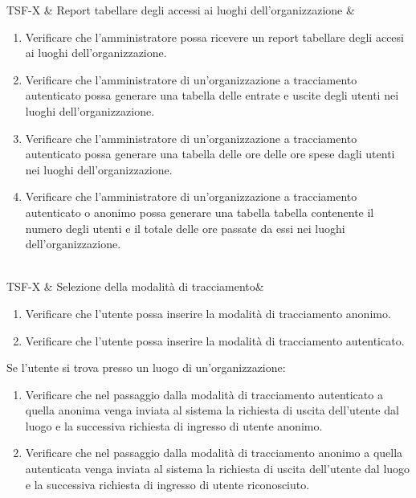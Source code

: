 TSF-X & Report tabellare degli accessi ai luoghi dell'organizzazione  & \begin{enumerate}
\item Verificare che l'amministratore possa ricevere un report tabellare degli accesi ai luoghi dell'organizzazione.
\item Verificare che l'amministratore di un'organizzazione a tracciamento autenticato possa generare una tabella delle entrate e uscite degli utenti nei luoghi dell'organizzazione.
\item Verificare che l'amministratore di un'organizzazione a tracciamento autenticato possa generare una tabella delle ore delle ore spese dagli utenti nei luoghi dell'organizzazione.
\item Verificare che l'amministratore di un'organizzazione a tracciamento autenticato o anonimo possa generare una tabella tabella contenente il numero degli utenti e il totale delle ore passate da essi nei luoghi dell’organizzazione. 
\end{enumerate} \\


TSF-X & Selezione della modalità di tracciamento& \begin{enumerate}
    \item Verificare che l'utente possa inserire la modalità di tracciamento anonimo.
    \item Verificare che l'utente possa inserire la modalità di tracciamento autenticato.
\end{enumerate}
Se l'utente si trova presso un luogo di un'organizzazione:
\begin{enumerate}
    \item Verificare che nel passaggio dalla modalità di tracciamento autenticato a quella anonima venga inviata al sistema la richiesta di uscita dell'utente dal luogo e la successiva richiesta di ingresso di utente anonimo.
    \item Verificare che nel passaggio dalla modalità di tracciamento anonimo a quella autenticata venga inviata al sistema la richiesta di uscita dell'utente dal luogo e la successiva richiesta di ingresso di utente riconosciuto.
\end{enumerate} \\

